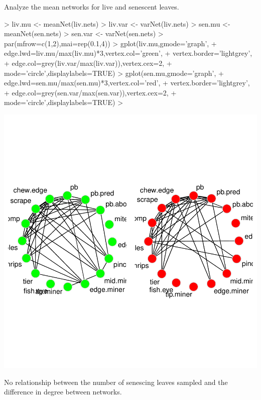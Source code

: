 \documentclass[12pt]{article}
\begin{document}
Analyze the mean networks for live and senescent leaves.

\begin{Schunk}
\begin{Sinput}
> liv.mu <- meanNet(liv.nets)
> liv.var <- varNet(liv.nets)
> sen.mu <- meanNet(sen.nets)
> sen.var <- varNet(sen.nets)
> par(mfrow=c(1,2),mai=rep(0.1,4))
> gplot(liv.mu,gmode='graph',
+       edge.lwd=liv.mu/max(liv.mu)*3,vertex.col='green',
+       vertex.border='lightgrey',
+       edge.col=grey(liv.var/max(liv.var)),vertex.cex=2,
+       mode='circle',displaylabels=TRUE)
> gplot(sen.mu,gmode='graph',
+       edge.lwd=sen.mu/max(sen.mu)*3,vertex.col='red',
+       vertex.border='lightgrey',
+       edge.col=grey(sen.var/max(sen.var)),vertex.cex=2,
+       mode='circle',displaylabels=TRUE)
> 
\end{Sinput}
\end{Schunk}
\includegraphics{notebook-004}

No relationship between the number of senescing leaves sampled and the difference in degree between networks.
\end{document}
